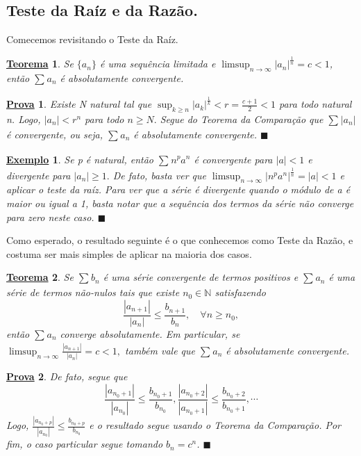 \documentclass{article}
\newtheorem*{theorem*}{\underline{Teorema}}
\newtheorem{example}{\underline{Exemplo}}
\newtheorem*{proof*}{\underline{Prova}}
\renewcommand\qedsymbol{$\blacksquare$}
\begin{document}
\subsection{Teste da Ra\'iz e da Raz\~ao.}
  Comecemos revisitando o Teste da Ra\'iz.
\begin{theorem*}
   Se $\{a_{n}\}$ \'e uma sequ\^encia limitada e $\limsup_{n\to\infty}|a_{n}|^{\frac{1}{n}} = c < 1$, ent\~ao $\sum\limits_{}^{}a_{n}$
  \'e absolutamente convergente.
 \end{theorem*}
\begin{proof*}
  Existe N natural tal que $\sup_{k\geq{n}}|a_{k}|^{\frac{1}{k}} < r = \frac{c+1}{2} < 1$ para todo natural n. Logo, $|a_{n}|<r^{n}$ para
todo $n\geq{N}.$ Segue do Teorema da Compara\c c\~ao que $\sum\limits_{}^{}|a_{n}|$ \'e convergente, ou seja, $\sum\limits_{}^{}a_{n}$ \'e absolutamente convergente. \qedsymbol
\end{proof*}
\begin{example}
  Se p \'e natural, ent\~ao $\sum\limits_{}^{}n^{p}a^{n}$ \'e convergente para $|a|< 1$ e divergente para $|a_{n}| \geq{1}.$ De fato,
basta ver que $\limsup_{n\to\infty}|n^{p}a^{n}|^{\frac{1}{n}} = |a| < 1$ e aplicar o teste da ra\'iz. Para ver que a s\'erie \'e divergente 
quando o m\'odulo de a \'e maior ou igual a 1, basta notar que a sequ\^encia dos termos da s\'erie n\~ao converge para zero neste caso. \qedsymbol
\end{example}
  Como esperado, o resultado seguinte \'e o que conhecemos como Teste da Raz\~ao, e costuma ser mais simples de aplicar na maioria dos casos.
\begin{theorem*}
  Se $\sum\limits_{}^{}b_{n}$ \'e uma s\'erie convergente de termos positivos e $\sum\limits_{}^{}a_{n}$ \'e uma s\'erie de termos
n\~ao-nulos tais que existe $n_{0}\in \mathbb{N}$ satisfazendo 
  $$
    \frac{|a_{n+1}|}{|a_{n}|} \leq{\frac{b_{n+1}}{b_{n}}},\quad \forall n\geq{n_{0}},
  $$
  ent\~ao $\sum\limits_{}^{}a_{n}$ converge absolutamente. Em particular, se $\limsup_{n\to\infty}\frac{|a_{n+1}|}{|a_{n}|} = c < 1,$
tamb\'em vale que $\sum\limits_{}^{}a_{n}$ \'e absolutamente convergente.
\end{theorem*}
\begin{proof*}
  De fato, segue que 
    $$
      \frac{|a_{n_{0}+1}|}{|a_{n_{0}}|} \leq{\frac{b_{n_{0}+1}}{b_{n_{0}}}}, \frac{|a_{n_{0}+2}|}{|a_{n_{0}+1}|} \leq{ \frac{b_{n_{0}+2}}{b_{n_{0}+1}}}, \cdots
    $$
    Logo, $\frac{|a_{n_{0}+p}|}{|a_{n_{0}}|}\leq{\frac{b_{n_{0}+p}}{b_{n_{0}}}}$ e o resultado segue usando o Teorema da Compara\c c\~ao. Por
    fim, o caso particular segue tomando $b_{n} = c^{n}$. \qedsymbol
\end{proof*}
\end{document}
